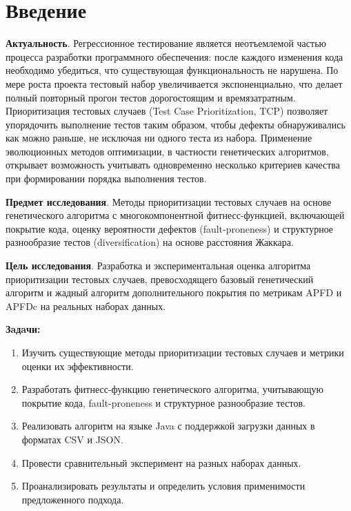 \chapter*{Введение} %


\textbf{Актуальность}. Регрессионное тестирование является неотъемлемой частью процесса разработки 
программного обеспечения: после каждого изменения кода необходимо убедиться, что существующая 
функциональность не нарушена. По мере роста проекта тестовый набор увеличивается экспоненциально, 
что делает полный повторный прогон тестов дорогостоящим и времязатратным. Приоритизация тестовых случаев 
(Test Case Prioritization, TCP) позволяет упорядочить выполнение тестов таким образом, чтобы дефекты 
обнаруживались как можно раньше, не исключая ни одного теста из набора. Применение эволюционных методов 
оптимизации, в частности генетических алгоритмов, открывает возможность учитывать одновременно несколько 
критериев качества при формировании порядка выполнения тестов.

\textbf{Предмет исследования}. Методы приоритизации тестовых случаев на основе генетического алгоритма с 
многокомпонентной фитнесс-функцией, включающей покрытие кода, оценку вероятности дефектов (fault-proneness) 
и структурное разнообразие тестов (diversification) на основе расстояния Жаккара.

\textbf{Цель исследования}. Разработка и экспериментальная оценка алгоритма приоритизации тестовых случаев, 
превосходящего базовый генетический алгоритм и жадный алгоритм дополнительного покрытия по метрикам APFD и 
APFDc на реальных наборах данных.

\textbf{Зaдaчи:}
\begin{enumerate}[1.]
	\item Изучить существующие методы приоритизации тестовых случаев и метрики оценки их эффективности.
	\item Разработать фитнесс-функцию генетического алгоритма, учитывающую покрытие кода, fault-proneness и структурное разнообразие тестов.
	\item Реализовать алгоритм на языке Java с поддержкой загрузки данных в форматах CSV и JSON.
	\item Провести сравнительный эксперимент на разных наборах данных.
	\item Проанализировать результаты и определить условия применимости предложенного подхода.
\end{enumerate} 
